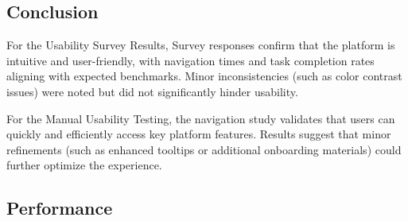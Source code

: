\documentclass[12pt, titlepage]{article}
\begin{document}
\subsection*{Conclusion}
\textbf{}

For the Usability Survey Results, Survey responses confirm that the platform is intuitive and user-friendly, with navigation times and task completion rates aligning with expected benchmarks.
Minor inconsistencies (such as color contrast issues) were noted but did not significantly hinder usability.

For the Manual Usability Testing, the navigation study validates that users can quickly and efficiently access key platform features.
Results suggest that minor refinements (such as enhanced tooltips or additional onboarding materials) could further optimize the experience.

		
\subsection{Performance}
\end{document}

